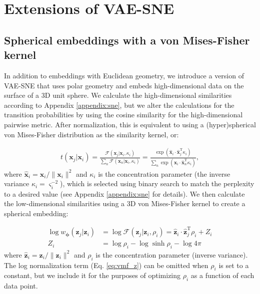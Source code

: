 \section{Extensions of VAE-SNE}
\label{appendix:extensions}
\subsection{Spherical embeddings with a von Mises-Fisher kernel}
\label{appendix:spherical}
In addition to embeddings with Euclidean geometry, we introduce a version of VAE-SNE that uses polar geometry and embeds high-dimensional data on the surface of a 3D unit sphere. We calculate the high-dimensional similarities according to Appendix \ref{appendix:sne}, but we alter the calculations for the transition probabilities by using the cosine similarity for the high-dimensional pairwise metric. After normalization, this is equivalent to using a (hyper)spherical von Mises-Fisher distribution as the similarity kernel, or:

\begin{align}
     t(\mathbf{x}_j | \mathbf{x}_i) = \frac{\mathcal{F}(\mathbf{x}_j | \mathbf{x}_i, \kappa_i)}{\sum_{n} \mathcal{F}(\mathbf{x}_n | \mathbf{x}_i, \kappa_i)} = \frac{\exp \left(\mathbf{\hat{x}}_i \cdot \mathbf{\hat{x}}_j^{\mathrm{T}} \kappa_i \right)}{\sum_{n} \exp \left(\mathbf{\hat{x}}_i \cdot \mathbf{\hat{x}}_n^{\mathrm{T}} \kappa_i\right)},
\end{align}
where $\mathbf{\hat{x}}_i = \mathbf{x}_i / \|\mathbf{x}_i\|^2$ and $\kappa_i$ is the concentration parameter (the inverse variance $\kappa_i = \varsigma_i^{-2}$), which is selected using binary search to match the perplexity to a desired value (see Appendix \ref{appendix:sne} for details). We then calculate the low-dimensional similarities using a 3D von Mises-Fisher kernel to create a spherical embedding:

\begin{subequations}
    \begin{align}
        \log w_{\boldsymbol{\phi}}(\mathbf{z}_j | \mathbf{z}_i) &= \log \mathcal{F}(\mathbf{z}_j | \mathbf{z}_i, \rho_i) = \mathbf{\hat{z}}_i \cdot \mathbf{\hat{z}}_j^{\mathrm{T}} \rho_i + Z_i \label{eq:vmf_logp}\\
        Z_i &= \log\rho_i - \log\sinh{\rho_i} - \log4\pi \label{eq:vmf_z}
\end{align}
\end{subequations}
where $\mathbf{\hat{z}}_i = \mathbf{z}_i / \|\mathbf{z}_i\|^2$ and $\rho_i$ is the concentration parameter (inverse variance). The log normalization term (Eq. \ref{eq:vmf_z})  can be omitted when $\rho_i$ is set to a constant, but we include it for the purposes of optimizing $\rho_i$ as a function of each data point.

